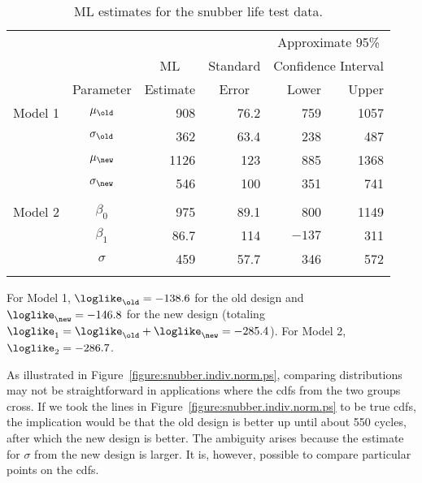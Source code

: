 \begin{table}
\caption{ML estimates for the snubber life test data.}
\centering\small
\begin{tabular}{lcrrrr} 
\\[-.5ex]
\hline
& & & & \multicolumn{2}{c}{Approximate 95\%}\\
& &\multicolumn{1}{c}{ML} &Standard & 
\multicolumn{2}{c}{Confidence Interval}\\  \cline{5-6}
& Parameter & Estimate& \multicolumn{1}{c}{Error} & Lower & Upper \\
\hline 
Model 1  &$\mu_{\old} $ & 908 &76.2 &759 & 1057 \\[.7ex] 
&$\sigma_{\old}$ &362 &63.4 &238 &487\\[1.2ex]
&$\mu_{\new} $ & 1126 &123 &885 &1368 \\[.7ex] 
&$\sigma_{\new}$ &546 &100 &351 &741 \\[.7ex] 
\hline 
\\[-1.8ex]
Model 2 
&$\beta_{0}$ &975  &89.1  &800    & 1149  \\[.7ex]
&$\beta_{1}$ &86.7 &114   &$-137$ &  311  \\[.7ex] 
&$\sigma$    & 459 & 57.7 & 346   & 572 \\[1.2ex]
\hline 
\\[-1.8ex]
\end{tabular}
\begin{minipage}[t]{4in}
For Model 1, $\loglike_{\old}=-138.6$ for the old design and
$\loglike_{\new}=-146.8$ for the new design (totaling
$\loglike_{1}=\loglike_{\old}+\loglike_{\new} =-285.4$). For Model 2,
$\loglike_{2}=-286.7$.
\label{table:snubber.mles}
\end{minipage}
\end{table}

As illustrated in Figure~\ref{figure:snubber.indiv.norm.ps}, comparing
distributions may not be straightforward in applications where the
cdfs from the two groups cross. If we took the lines in
Figure~\ref{figure:snubber.indiv.norm.ps} to be true cdfs, the
implication would be that the old design is better up until about 550
cycles, after which the new design is better. The ambiguity arises
because the estimate for $\sigma$ from the new design is larger.
It is, however, possible to compare particular points on the cdfs.

